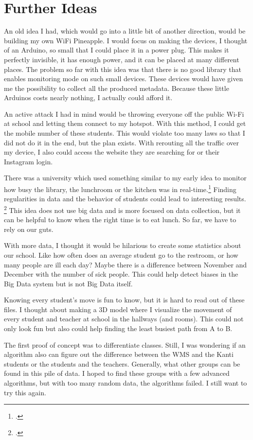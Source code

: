 \documentclass[paper=a4, fontsize=11pt]{article}
\begin{document}
\section{Further Ideas}
An old idea I had, which would go into a little bit of another direction, would be building my own WiFi Pineapple. I would focus on making the devices, I thought of an Arduino, so small that I could place it in a power plug. This makes it perfectly invisible, it has enough power, and it can be placed at many different places. The problem so far with this idea was that there is no good library that enables monitoring mode on such small devices. These devices would have given me the possibility to collect all the produced metadata. Because these little Arduinos costs nearly nothing, I actually could afford it.

An active attack I had in mind would be throwing everyone off the public Wi-Fi at school and letting them connect to my hotspot. With this method, I could get the mobile number of these students. This would violate too many laws so that I did not do it in the end, but the plan exists. With rerouting all the traffic over my device, I also could access the website they are searching for or their Instagram login.


There was a university which used something similar to my early idea to monitor how busy the library, the lunchroom or the kitchen was in real-time.\footcite{waitz}
Finding regularities in data and the behavior of students could lead to interesting results. \footcite{deanonymisationmac}
This idea does not use big data and is more focused on data collection, but it can be helpful to know when the right time is to eat lunch. So far, we have to rely on our guts.

With more data, I thought it would be hilarious to create some statistics about our school. Like how often does an average student go to the restroom, or how many people are ill each day? Maybe there is a difference between November and December with the number of sick people. This could help detect biases in the Big Data system but is not Big Data itself.


Knowing every student's move is fun to know, but it is hard to read out of these files. I thought about making a 3D model where I visualize the movement of every student and teacher at school in the hallways (and rooms). This could not only look fun but also could help finding the least busiest path from A to B.

The first proof of concept was to differentiate classes. Still, I was wondering if an algorithm also can figure out the difference between the WMS and the Kanti students or the students and the teachers. Generally, what other groups can be found in this pile of data. I hoped to find these groups with a few advanced algorithms, but with too many random data, the algorithms failed. I still want to try this again.
\end{document}
